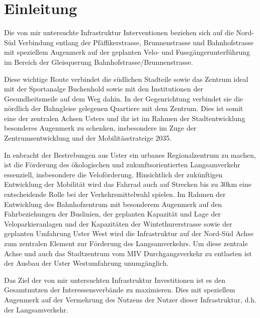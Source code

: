 %
%            
%
%
%

\chapter{Einleitung}
\label{chap:Einleitung}

Die von mir untersuchte Infrastruktur Interventionen beziehen sich auf die Nord-Süd Verbindung
entlang der Pfäffikerstrasse, Brunnenstrasse und Bahnhofstrasse mit speziellem Augenmerk auf der geplanten Velo- und Fussgängerunterführung im Bereich der Gleisquerung Bahnhofstrasse/Brunnenstrasse. 

Diese wichtige Route verbindet die südlichen Stadteile sowie das Zentrum ideal mit der Sportanalge Buchenhold sowie mit den Institutionen der Gesundheitsmeile auf dem Weg dahin. In der Gegenrichtung verbindet sie die nördlich der Bahngleise gelegenen Quartiere mit dem Zentrum. Dies ist somit eine der zentralen Achsen Usters und ihr ist im Rahmen der Stadtentwicklung besonderes Augenmerk zu schenken, insbesondere im Zuge der Zentrumsentwicklung und der Mobilitässtrateige 2035. 

In enbracht der Bestrebungen aus Uster ein urbanes Regionalzentrum zu machen, ist die Förderung des ökologischen und zukunftsorientierten Langsamverkehr essenziell, insbesondere die Veloförderung. Hinsichtlich der zukünftigen Entwicklung der Mobilität wird das Fahrrad auch auf Strecken bis zu 30km eine entscheidende Rolle bei der Verkehrsmittelwahl spielen. 
Im Rahmen der Entwicklung des Bahnhofzentrum mit besonderem Augenmerk auf den Fahrbeziehungen der Buslinien, der geplanten Kapazität und Lage der Veloparkieranlagen und der Kapazitäten der Wintethurerstrasse sowie der geplanten Umfahrung Uster West wird die Infrastruktur auf der Nord-Süd Achse zum zentralen Element zur Förderung des Langsamverkehrs. Um diese zentrale Achse und auch das Stadtzentrum vom MIV Durchgangsverkehr zu entlasten ist der Ausbau der Uster Westumfahrung unumgänglich. 

Das Ziel der von mir untersuchten Infrastruktur Investitionen ist es den Gesamtnutzen der Interessensverbände zu maximieren. \newline Dies mit speziellem Augenmerk auf der Vermehrung des Nutzens der Nutzer dieser Infrastruktur, d.h. der Langsamverkehr. 

